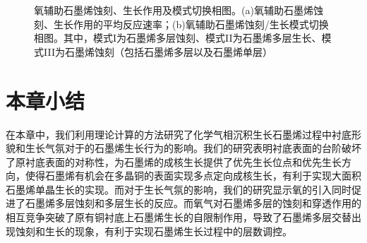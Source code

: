\begin{figure}[htb]
    \caption{氧辅助石墨烯蚀刻、生长作用及模式切换相图。(a)氧辅助石墨烯蚀刻、生长作用的平均反应速率；(b)氧辅助石墨烯蚀刻/生长模式切换相图。其中，模式I为石墨烯多层蚀刻、模式II为石墨烯多层生长、模式III为石墨烯蚀刻（包括石墨烯多层以及石墨烯单层）}
    \label{fig:FLG_model}
\end{figure}

\section{本章小结}
在本章中，我们利用理论计算的方法研究了化学气相沉积生长石墨烯过程中衬底形貌和生长气氛对于的石墨烯生长行为的影响。我们的研究表明衬底表面的台阶破坏了原衬底表面的对称性，为石墨烯的成核生长提供了优先生长位点和优先生长方向，使得石墨烯有机会在多晶铜的表面实现多点定向成核生长，有利于实现大面积石墨烯单晶生长的实现。而对于生长气氛的影响，我们的研究显示氧的引入同时促进了石墨烯多层蚀刻和多层生长的反应。而氧气对石墨烯多层的蚀刻和穿透作用的相互竞争突破了原有铜衬底上石墨烯生长的自限制作用，导致了石墨烯多层交替出现蚀刻和生长的现象，有利于实现石墨烯生长过程中的层数调控。
